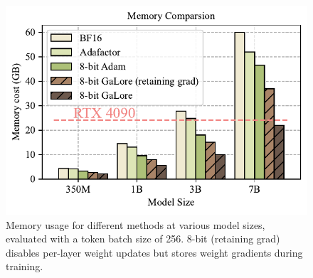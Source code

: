 \begin{figure}[t!]
    \centering
    \includegraphics[width=0.9\linewidth]{figures/memory.pdf}
    \vspace{-4.5mm}
    \caption{\small{Memory usage for different methods at various model sizes, evaluated with a token batch size of 256. 8-bit \lowrank{} (retaining grad) disables per-layer weight updates but stores weight gradients during training.
    }}
    \vspace{-4mm}
    \label{fig:memory_vs_model_size}
\end{figure}

